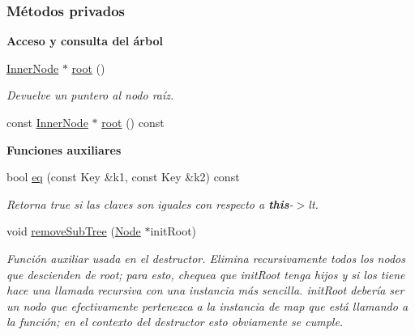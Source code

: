 \subsubsection*{Métodos privados}
\begin{Indent}\textbf{ Acceso y consulta del árbol}\par
\begin{DoxyCompactItemize}
\item 
\hyperlink{structaed2_1_1map_1_1InnerNode}{Inner\+Node} $\ast$ \hyperlink{classaed2_1_1map_a07ab50eda249a57858a34037d4c4c7b2_a07ab50eda249a57858a34037d4c4c7b2}{root} ()
\begin{DoxyCompactList}\small\item\em Devuelve un puntero al nodo raíz. \end{DoxyCompactList}\item 
const \hyperlink{structaed2_1_1map_1_1InnerNode}{Inner\+Node} $\ast$ \hyperlink{classaed2_1_1map_a66fe019d885578cc52949409f80858eb_a66fe019d885578cc52949409f80858eb}{root} () const
\end{DoxyCompactItemize}
\end{Indent}
\begin{Indent}\textbf{ Funciones auxiliares}\par
\begin{DoxyCompactItemize}
\item 
bool \hyperlink{classaed2_1_1map_aebf6c09c424c39a874798165401b309e_aebf6c09c424c39a874798165401b309e}{eq} (const Key \&k1, const Key \&k2) const
\begin{DoxyCompactList}\small\item\em Retorna true si las claves son iguales con respecto a {\bfseries this}-\/$>$lt. \end{DoxyCompactList}\item 
void \hyperlink{classaed2_1_1map_a533bd88d0b7a584e3c968548d246c255_a533bd88d0b7a584e3c968548d246c255}{remove\+Sub\+Tree} (\hyperlink{structaed2_1_1map_1_1Node}{Node} $\ast$init\+Root)
\begin{DoxyCompactList}\small\item\em Función auxiliar usada en el destructor. Elimina recursivamente todos los nodos que descienden de root; para esto, chequea que init\+Root tenga hijos y si los tiene hace una llamada recursiva con una instancia más sencilla. init\+Root debería ser un nodo que efectivamente pertenezca a la instancia de map que está llamando a la función; en el contexto del destructor esto obviamente se cumple. \end{DoxyCompactList}\end{DoxyCompactItemize}
\end{Indent}
